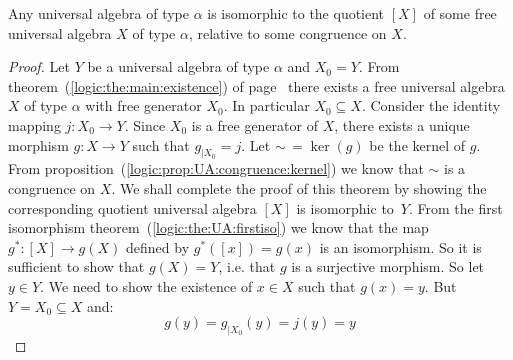 \begin{theorem}\label{logic:the:quotient:free:algebra}
Any universal algebra of type $\alpha$ is isomorphic to the quotient
$[X]$ of some free universal algebra $X$ of type $\alpha$, relative
to some congruence on $X$.
\end{theorem}
\begin{proof}
Let $Y$ be a universal algebra of type $\alpha$ and $X_{0}=Y$. From
theorem~(\ref{logic:the:main:existence}) of
page~\pageref{logic:the:main:existence} there exists a free
universal algebra $X$ of type $\alpha$ with free generator $X_{0}$.
In particular $X_{0}\subseteq X$. Consider the identity mapping
$j:X_{0}\to Y$. Since $X_{0}$ is a free generator of $X$, there
exists a unique morphism $g:X\to Y$ such that $g_{|X_{0}}=j$. Let
$\sim\,=\ker(g)$ be the kernel of $g$. From
proposition~(\ref{logic:prop:UA:congruence:kernel}) we know that
$\sim$ is a congruence on $X$. We shall complete the proof of this
theorem by showing the corresponding quotient universal algebra
$[X]$ is isomorphic to~$Y$. From the first isomorphism
theorem~(\ref{logic:the:UA:firstiso}) we know that the map
$g^{*}:[X]\to g(X)$ defined by $g^{*}([x])=g(x)$ is an isomorphism.
So it is sufficient to show that $g(X)=Y$, i.e. that $g$ is a
surjective morphism. So let $y\in Y$. We need to show the existence
of $x\in X$ such that $g(x)=y$. But $Y=X_{0}\subseteq X$ and:
    \[
    g(y)=g_{|X_{0}}(y)=j(y)=y
    \]
\end{proof}
